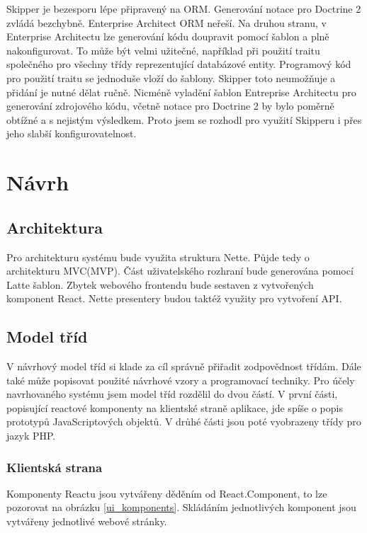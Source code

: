 \documentclass[thesis=B,czech]{FITthesis}[2012/06/26]
\begin{document}
	Skipper je bezesporu lépe připravený na ORM. Generování notace pro Doctrine 2 zvládá bezchybně. Enterprise Architect ORM neřeší. Na druhou stranu, v Enterprise Architectu lze generování kódu doupravit pomocí šablon a plně nakonfigurovat. To může být velmi užitečné, například při použití traitu společného pro všechny třídy reprezentující databázové entity. Programový kód pro použití traitu se jednoduše vloží do šablony. Skipper toto neumožňuje a přidání je nutné dělat ručně. Nicméně vyladění šablon Entreprise Architectu pro generování zdrojového kódu, včetně notace pro Doctrine 2 by bylo poměrně obtížné a s nejistým výsledkem. Proto jsem se rozhodl pro využití Skipperu i přes jeho slabší konfigurovatelnost.	


\chapter{Návrh}

\section{Architektura}
Pro architekturu systému bude využita struktura Nette. Půjde tedy o architekturu MVC(MVP). Část uživatelského rozhraní bude generována pomocí Latte šablon. Zbytek webového frontendu bude sestaven z vytvořených komponent React. Nette presentery budou taktéž využity pro vytvoření API.

\section{Model tříd}
	V návrhový model tříd si klade za cíl správně přiřadit zodpovědnost třídám. Dále také může popisovat použité návrhové vzory a programovací techniky.\cite{si1_pred6} Pro účely navrhovaného systému jsem model tříd rozdělil do dvou částí. V první části, popisující reactové komponenty na klientské straně aplikace, jde spíše o popis prototypů JavaScriptových objektů. V drůhé části jsou poté vyobrazeny třídy pro jazyk PHP.
	
\subsection{Klientská strana}
	Komponenty Reactu jsou vytvářeny děděním od React.Component, to lze pozorovat na obrázku \ref{ui_komponents}. Skládáním jednotlivých komponent jsou vytvářeny jednotlivé webové stránky.
	
\end{document}
